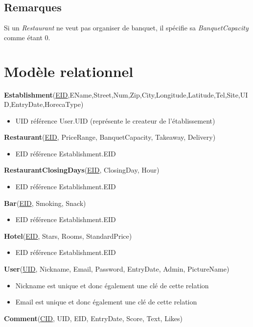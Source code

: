 \documentclass[11pt,a4paper]{report}
\begin{document}
\subsection*{Remarques}
Si un \textit{Restaurant} ne veut pas organiser de banquet, il spécifie sa \textit{BanquetCapacity} comme étant 0.


\section*{Modèle relationnel}
\noindent
\textbf{Establishment}(\underline{EID},EName,Street,Num,Zip,City,Longitude,Latitude,Tel,Site,UID,EntryDate,HorecaType)
\begin{itemize}
\item UID référence User.UID (représente le createur de l'établissement)\\
\end{itemize}
\textbf{Restaurant}(\underline{EID}, PriceRange, BanquetCapacity, Takeaway, Delivery)
\begin{itemize}
\item EID référence Establishment.EID\\
\end{itemize} 
\textbf{RestaurantClosingDays}(\underline{EID}, ClosingDay, Hour)
\begin{itemize}
\item EID référence Establishment.EID\\
\end{itemize}
\textbf{Bar}(\underline{EID}, Smoking, Snack)
\begin{itemize}
\item EID référence Establishment.EID\\
\end{itemize}
\textbf{Hotel}(\underline{EID}, Stars, Rooms, StandardPrice)
\begin{itemize}
\item EID référence Establishment.EID\\
\end{itemize}
\textbf{User}(\underline{UID}, Nickname, Email, Password, EntryDate, Admin, PictureName)
\begin{itemize}
\item Nickname est unique et donc également une clé de cette relation
\item Email est unique et donc également une clé de cette relation\\
\end{itemize}
\textbf{Comment}(\underline{CID}, UID, EID, EntryDate, Score,  Text, Likes)
\end{document}
